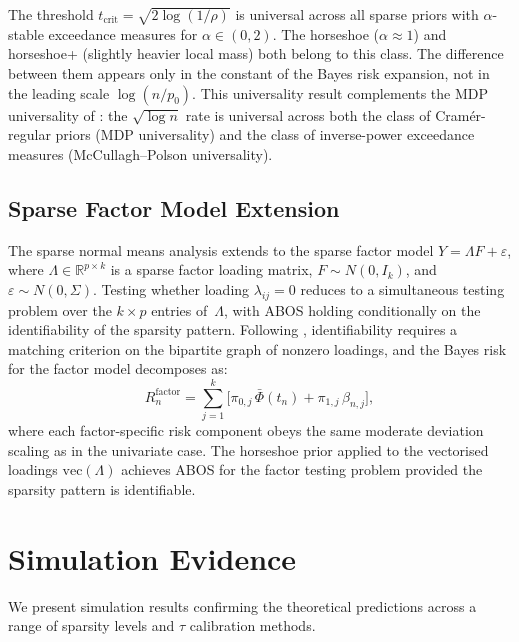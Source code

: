 \documentclass[12pt]{article}
\newcommand{\R}{\mathbb{R}}
\newcommand{\tcrit}{t_{\mathrm{crit}}}
\begin{document}
The threshold $\tcrit = \sqrt{2\log(1/\rho)}$ is universal across all sparse priors with $\alpha$-stable exceedance measures for $\alpha \in (0,2)$. The horseshoe ($\alpha \approx 1$) and horseshoe+ (slightly heavier local mass) both belong to this class. The difference between them appears only in the constant of the Bayes risk expansion, not in the leading scale $\log(n/p_0)$. This universality result complements the MDP universality of : the $\sqrt{\log n}$ rate is universal across both the class of Cram\'er-regular priors (MDP universality) and the class of inverse-power exceedance measures (McCullagh--Polson universality).

\subsection{Sparse Factor Model Extension}\label{sec:factor}

The sparse normal means analysis extends to the sparse factor model $Y = \Lambda F + \varepsilon$, where $\Lambda \in \R^{p \times k}$ is a sparse factor loading matrix, $F \sim N(0, I_k)$, and $\varepsilon \sim N(0, \Sigma)$. Testing whether loading $\lambda_{ij} = 0$ reduces to a simultaneous testing problem over the $k \times p$ entries of~$\Lambda$, with ABOS holding conditionally on the identifiability of the sparsity pattern. Following \citet{drton2025algebraic}, identifiability requires a matching criterion on the bipartite graph of nonzero loadings, and the Bayes risk for the factor model decomposes as:
\begin{equation}\label{eq:factor-risk}
  R_n^{\mathrm{factor}} = \sum_{j=1}^{k} \bigl[\pi_{0,j}\,\bar{\Phi}(t_n) + \pi_{1,j}\,\beta_{n,j}\bigr],
\end{equation}
where each factor-specific risk component obeys the same moderate deviation scaling as in the univariate case. The horseshoe prior applied to the vectorised loadings $\mathrm{vec}(\Lambda)$ achieves ABOS for the factor testing problem provided the sparsity pattern is identifiable.


\section{Simulation Evidence}\label{sec:simulations}

We present simulation results confirming the theoretical predictions across a range of sparsity levels and $\tau$ calibration methods.
\end{document}
